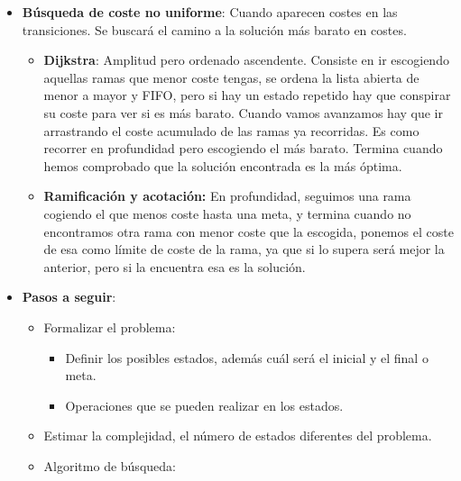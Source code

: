 \documentclass[12pt, twoside, openright]{report} %
\begin{document}
\begin{itemize}
\begin{itemize}
    \end{itemize}
  \item \textbf{Búsqueda de coste no uniforme}: Cuando aparecen costes en
    las transiciones. Se buscará el camino a la solución más barato en
    costes.
    

    \begin{itemize}
    \item \textbf{Dijkstra}: Amplitud pero ordenado ascendente. Consiste en
      ir escogiendo aquellas ramas que menor coste tengas, se ordena la
      lista abierta de menor a mayor y FIFO, pero si hay un estado
      repetido hay que conspirar su coste para ver si es más barato.
      Cuando vamos avanzamos hay que ir arrastrando el coste acumulado
      de las ramas ya recorridas. Es como recorrer en profundidad pero
      escogiendo el más barato. Termina cuando hemos comprobado que la
      solución encontrada es la más óptima.
      
    \item \textbf{Ramificación y acotación:} En profundidad, seguimos una
      rama cogiendo el que menos coste hasta una meta, y termina cuando
      no encontramos otra rama con menor coste que la escogida, ponemos
      el coste de esa como límite de coste de la rama, ya que si lo
      supera será mejor la anterior, pero si la encuentra esa es la
      solución.
      
    \end{itemize}

	\pagebreak
  \item \textbf{Pasos a seguir}:
    

    \begin{itemize}
    \item Formalizar el problema:
      

      \begin{itemize}
      \item Definir los posibles estados, además cuál será el inicial y el
        final o meta.
        
      \item Operaciones que se pueden realizar en los estados.
        
      \end{itemize}
    \item Estimar la complejidad, el número de estados diferentes del
      problema.
      
    \item Algoritmo de búsqueda:
      


\end{itemize}
\end{itemize}
\end{document}
